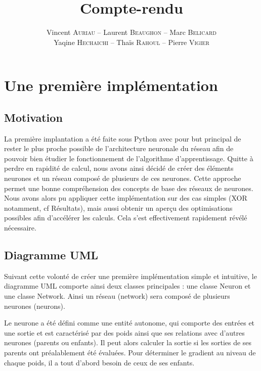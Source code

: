 \documentclass{report}
\title{Compte-rendu}
\author{Vincent \textsc{Auriau} -- Laurent \textsc{Beaughon} -- Marc \textsc{Belicard} \\ Yaqine \textsc{Hechaichi} -- Thaïs \textsc{Rahoul} -- Pierre \textsc{Vigier}}
\theoremstyle{plain}
\theoremstyle{definition}
\theoremstyle{remark}
\begin{document}
\maketitle

\tableofcontents



\chapter{Une première implémentation}

\section{Motivation}

La première implantation a été faite sous Python avec pour but principal de rester le plus proche possible de l'architecture neuronale du réseau afin de pouvoir bien étudier le fonctionnement de l'algorithme d'apprentissage. Quitte à perdre en rapidité de calcul, nous avons ainsi décidé de créer des éléments neurones et un réseau composé de plusieurs de ces neurones. Cette approche permet une bonne compréhension des concepts de base des réseaux de neurones. Nous avons alors pu appliquer cette implémentation sur des cas simples (XOR notamment, cf Résultats), mais aussi obtenir un aperçu des optimisations possibles afin d'accélérer les calculs. Cela s'est effectivement rapidement révélé nécessaire.  

\section{Diagramme UML}

Suivant cette volonté de créer une première implémentation simple et intuitive, le diagramme UML comporte ainsi deux classes principales : une classe Neuron et une classe Network. Ainsi un réseau (network) sera composé de plusieurs neurones (neurons).

Le neurone a été défini comme une entité autonome, qui comporte des entrées et une sortie et est caractérisé par des poids ainsi que ses relations avec d'autres neurones (parents ou enfants). Il peut alors calculer la sortie si les sorties de ses parents ont préalablement été évaluées. Pour déterminer le gradient au niveau de chaque poids, il a tout d'abord besoin de ceux de ses enfants.
\end{document}

